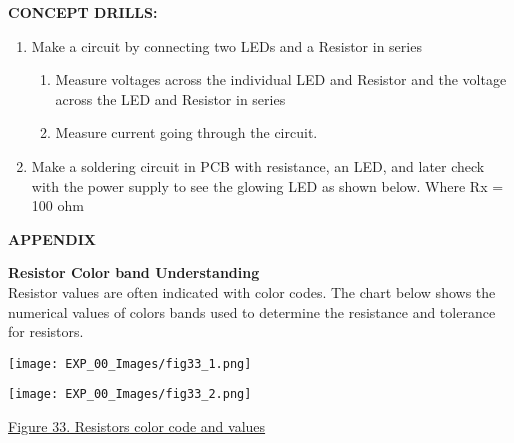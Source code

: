 \documentclass[12pt,a4paper]{article}
\begin{document}
\begin{justify}
\begin{enumerate}
\end{enumerate}

\noindent \textbf{\large CONCEPT DRILLS:}
\vspace{-6mm}
\begin{enumerate}
 \setlength\itemsep{-0.3em}
\item Make a circuit by connecting two LEDs  and a Resistor in series 
\begin{enumerate}
 \setlength\itemsep{-0.3em}
\item	Measure voltages across the individual LED and Resistor and the voltage across the LED and Resistor in series
\item	Measure current going through the circuit.
\end{enumerate}
 
\item Make a soldering circuit in PCB with resistance, an LED, and later check with the power supply to see the glowing LED as shown below. Where Rx = 100 ohm
\end{enumerate}

\vspace{10cm}
\begin{center}
\noindent \textbf{APPENDIX}
\end{center}

\noindent \textbf{Resistor Color band Understanding}\\
Resistor values are often indicated with color codes. The chart below shows the numerical values of colors bands used to determine the resistance and tolerance for resistors.

\vspace{-4mm}

\begin{center} 
\texttt{[image: EXP\_00\_Images/fig33\_1.png]}
\end{center}
\vspace{-8mm}
\begin{center} 
\texttt{[image: EXP\_00\_Images/fig33\_2.png]}

{\href{https://www.petervis.com/electronics/Standard_Resistor_Values/10K.html} {Figure 33. Resistors color code and values}} \end{center}


\end{justify}
\end{document}
